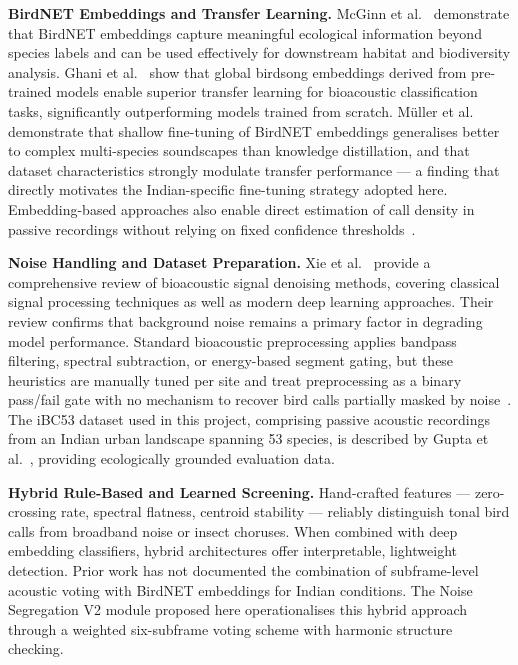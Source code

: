 \documentclass[a4paper,12pt]{article}
\begin{document}
\noindent
\textbf{BirdNET Embeddings and Transfer Learning.}
McGinn et al.\ \cite{McGinn} demonstrate that BirdNET embeddings capture meaningful ecological
information beyond species labels and can be used effectively for downstream habitat and
biodiversity analysis. Ghani et al.\ \cite{Ghani} show that global birdsong embeddings derived
from pre-trained models enable superior transfer learning for bioacoustic classification tasks,
significantly outperforming models trained from scratch. M\"{u}ller et al.~\cite{Muller} demonstrate
that shallow fine-tuning of BirdNET embeddings generalises better to complex multi-species
soundscapes than knowledge distillation, and that dataset characteristics strongly modulate
transfer performance --- a finding that directly motivates the Indian-specific fine-tuning strategy
adopted here. Embedding-based approaches also enable direct estimation of call density in passive
recordings without relying on fixed confidence thresholds~\cite{McGinn}.

\vspace{0.3cm}

\noindent
\textbf{Noise Handling and Dataset Preparation.}
Xie et al.\ \cite{Xie} provide a comprehensive review of bioacoustic signal denoising methods,
covering classical signal processing techniques as well as modern deep learning approaches.
Their review confirms that background noise remains a primary factor in degrading model
performance. Standard bioacoustic preprocessing applies bandpass filtering, spectral subtraction,
or energy-based segment gating, but these heuristics are manually tuned per site and treat
preprocessing as a binary pass/fail gate with no mechanism to recover bird calls partially
masked by noise~\cite{Stowell}. The iBC53 dataset used in this project, comprising passive
acoustic recordings from an Indian urban landscape spanning 53 species, is described by
Gupta et al.~\cite{iBC53}, providing ecologically grounded evaluation data.

\vspace{0.3cm}

\noindent
\textbf{Hybrid Rule-Based and Learned Screening.}
Hand-crafted features --- zero-crossing rate, spectral flatness, centroid stability --- reliably
distinguish tonal bird calls from broadband noise or insect choruses. When combined with deep
embedding classifiers, hybrid architectures offer interpretable, lightweight detection. Prior work
has not documented the combination of subframe-level acoustic voting with BirdNET embeddings for
Indian conditions. The Noise Segregation V2 module proposed here operationalises this hybrid
approach through a weighted six-subframe voting scheme with harmonic structure checking.
\end{document}
